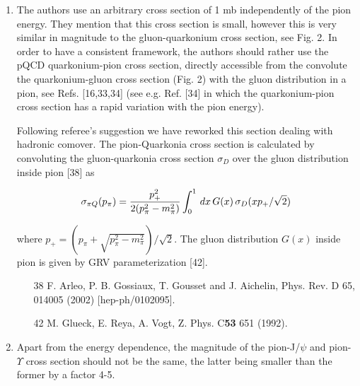 \documentclass[aps,prc,preprint,superscriptaddress,showpacs,showkeys]{revtex4-1}
\begin{document}
\begin{enumerate}

\item { \color{red} The authors use an arbitrary cross section of 1 mb independently of
the pion energy. They mention that this cross section is small,
however this is very similar in magnitude to the gluon-quarkonium
cross section, see Fig. 2. 
In order to have a consistent framework, the authors should rather use
the pQCD quarkonium-pion cross section, directly accessible from the
convolute the quarkonium-gluon cross section (Fig. 2) with the gluon
distribution in a pion, see Refs. [16,33,34] (see e.g. Ref. [34] in
which the quarkonium-pion cross section has a rapid variation with the
pion energy).}

{\color{blue} 
  Following referee's suggestion we have reworked this section dealing with hadronic comover.
  The pion-Quarkonia cross section is calculated by convoluting the gluon-quarkonia cross section $\sigma_D$
over the gluon distribution inside pion [38] as 

\begin{equation}
\sigma_{\pi Q} (p_{\pi}) = {p_+^2 \over 2(p_\pi^2 - m_\pi^2)} \int_0^1 \, dx \, G(x) \, \sigma_D(xp_+/\sqrt {2}) 
\end{equation}

where $p_+ = (p_\pi + \sqrt{p_\pi^2-m_\pi^2})/\sqrt{2}$. The gluon distribution $G(x)$ inside pion is 
given by GRV parameterization [42]. 


\begin{itemize}
 \item [38] F. Arleo, P. B. Gossiaux, T. Gousset and J. Aichelin, Phys. Rev. D 65, 014005 (2002) [hep-ph/0102095].
 \item [42] M. Glueck, E. Reya, A. Vogt, Z. Phys. C{\bf 53} 651 (1992).
\end{itemize}

}

\item { \color{red} Apart from the energy dependence, the magnitude of the pion-J/$\psi$ and
pion-$\Upsilon$ cross section should not be the same, the latter being
smaller than the former by a factor 4-5.}


\end{enumerate}
\end{document}
